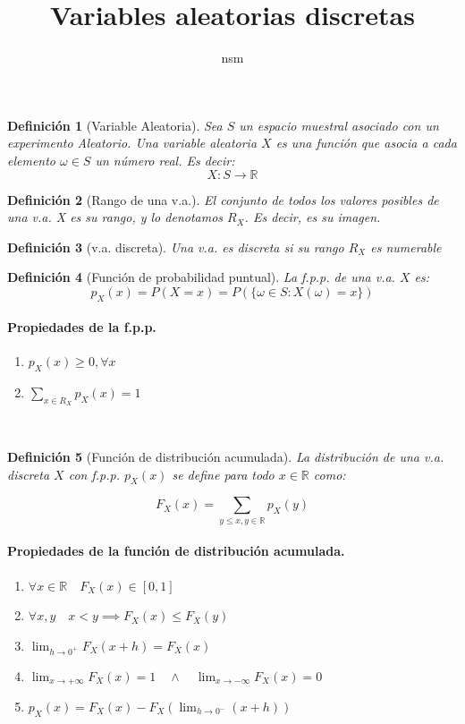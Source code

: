 \documentclass{article}
\newtheorem{mydef}{Definici\'on}
\begin{document}
\title{Variables aleatorias discretas}
\author{nsm}

\maketitle

\begin{mydef}[Variable Aleatoria]
  Sea $S$ un espacio muestral asociado con un experimento Aleatorio.
  Una \emph{variable aleatoria} $X$ es una funci\'on que asocia a
  cada elemento $\omega \in S$ un n\'umero real. Es decir:
  \[
    X: S \to \mathbb{R}
  \]
\end{mydef}

\begin{mydef}[Rango de una v.a.]
  El conjunto de todos los valores posibles de una v.a. X es su rango,
  y lo denotamos $R_X$. Es decir, es su imagen.
\end{mydef}

\begin{mydef}[v.a. discreta]
  Una v.a. es \emph{discreta} si su rango $R_X$ es numerable
\end{mydef}

\begin{mydef}[Funci\'on de probabilidad puntual]
  La f.p.p. de una v.a. $X$ es:
  \[
    p_X(x) = P(X = x) = P(\{\omega \in S : X(\omega) = x \})
  \]
  
\end{mydef}

\paragraph{Propiedades de la f.p.p.}
\begin{enumerate}
    \item $ p_X(x) \geq 0, \forall x $
    \item $\sum_{x\in R_X} p_X(x) = 1$
\end{enumerate}
\

\begin{mydef}[Funci\'on de distribuci\'on acumulada]
  La \emph{distribuci\'on} de una v.a. discreta $X$ con f.p.p.
  $p_X(x)$ se define para todo $x \in \mathbb{R}$ como:

  \[
    F_X(x) = \sum_{y \leq x, y \in \mathbb{R}} p_X(y)
  \]
\end{mydef}

\paragraph{Propiedades de la funci\'on de distribuci\'on acumulada.}
\begin{enumerate}
    \item $ \forall x \in \mathbb{R} \quad F_X(x) \in [0,1] $
    \item $ \forall x, y \quad x < y \implies F_X(x) \leq F_X(y) $
    \item $ \lim_{h \to 0^+} F_X(x + h) = F_X(x) $
    \item $ \lim_{x \to +\infty} F_X(x) = 1
      \quad \land \quad \lim_{x \to -\infty} F_X(x) = 0$
    \item $ p_X(x) = F_X(x) - F_X(\lim_{h\to 0^-} (x + h))$
\end{enumerate}
\
\end{document}
